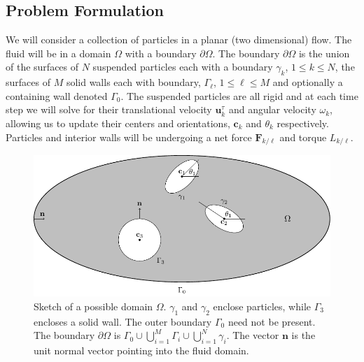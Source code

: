 \documentclass[preprint, 10pt]{elsarticle}
\begin{document}
\subsection{Problem Formulation}

We will consider a collection of particles in a planar (two dimensional) flow. The fluid will be in a domain $\Omega$ with a boundary $\partial\Omega$. The boundary $\partial\Omega$ is the union of the surfaces of $N$ suspended particles each with a boundary $\gamma_k$, $1\leq k \leq N$, the surfaces of $M$ solid walls each with boundary, $\Gamma_\ell$, $1\leq\ell\leq M$ and optionally a containing wall  denoted $\Gamma_0$. The suspended particles are all rigid and at each time step we will solve for their translational velocity $\mathbf{u}^{\tau}_k$ and angular velocity $\omega_k$, allowing us to update their centers and orientations, $\mathbf{c}_k$ and $\theta_k$ respectively. Particles and interior walls will be undergoing a net force $\mathbf{F}_{k/\ell}$  and torque $L_{k/\ell}$. 

\begin{figure}[!h]
\begin{center}
\includegraphics{figures/multiply_connected.pdf}
\end{center}
\caption{Sketch of a possible domain $\Omega$. $\gamma_1$ and $\gamma_2$ enclose particles, while $\Gamma_3$ encloses a solid wall. The outer boundary $\Gamma_0$ need not be present. The boundary $\partial\Omega$ is $\Gamma_0\cup\bigcup\limits_{i=1}^{M}\Gamma_i\cup\bigcup\limits_{i=1}^N \gamma_i$. The vector $\mathbf{n}$ is the unit normal vector pointing into the fluid domain. }
\end{figure}
\end{document}
